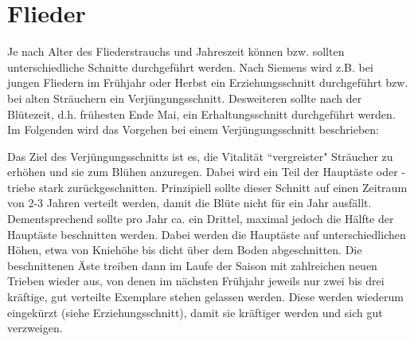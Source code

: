 \documentclass[]{article}
\title{}
\author{}
\begin{document}
\maketitle

\begin{abstract}

\end{abstract}

\section{Flieder}

Je nach Alter des Fliederstrauchs und Jahreszeit können bzw. sollten unterschiedliche Schnitte durchgeführt werden.
Nach Siemens \cite{Siemens2021} wird z.B. bei jungen Fliedern im Frühjahr oder Herbst ein Erziehungsschnitt durchgeführt bzw. bei alten Sträuchern ein Verjüngungsschnitt.
Desweiteren sollte nach der Blütezeit, d.h. frühesten Ende Mai, ein Erhaltungsschnitt durchgeführt werden.
Im Folgenden wird das Vorgehen bei einem Verjüngungsschnitt beschrieben:

Das Ziel des Verjüngungsschnitts ist es, die Vitalität ``vergreister" Sträucher zu erhöhen und sie zum Blühen anzuregen. 
Dabei wird ein Teil der Hauptäste oder -triebe stark zurückgeschnitten.
Prinzipiell sollte dieser Schnitt auf einen Zeitraum von 2-3 Jahren verteilt werden, damit die Blüte nicht für ein Jahr ausfällt.
Dementsprechend sollte pro Jahr ca. ein Drittel, maximal jedoch die Hälfte der Hauptäste beschnitten werden.
Dabei werden die Hauptäste auf unterschiedlichen Höhen, etwa von Kniehöhe bis dicht über dem Boden abgeschnitten.
Die beschnittenen Äste treiben dann im Laufe der Saison mit zahlreichen neuen Trieben wieder aus, von denen im nächsten Frühjahr jeweils nur zwei bis drei kräftige, gut verteilte Exemplare stehen gelassen werden.
Diese werden wiederum eingekürzt (siehe Erziehungsschnitt), damit sie kräftiger werden und sich gut verzweigen. 







\end{document}
